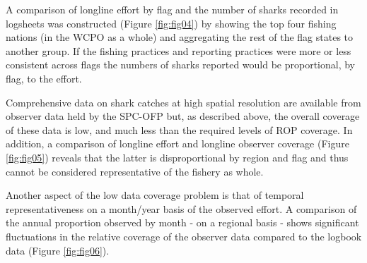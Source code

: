 \documentclass[12pt]{SCreport}
\begin{document}
A comparison of longline effort by flag and the number of sharks recorded in logsheets was constructed (Figure \ref{fig:fig04}) by showing the top four fishing nations (in the WCPO as a whole) and aggregating the rest of the flag states to another group. If the fishing practices and reporting practices were more or less consistent across flags the numbers of sharks reported would be proportional, by flag, to the effort.

Comprehensive data on shark catches at high spatial resolution are available from observer data held by the SPC-OFP but, as described above, the overall coverage of these data is low, and much less than the required levels of ROP coverage. In addition, a comparison of longline effort and longline observer coverage (Figure \ref{fig:fig05}) reveals that the latter is disproportional by region and flag and thus cannot be considered representative of the fishery as whole.

Another aspect of the low data coverage problem is that of temporal representativeness on a month/year basis of the observed effort. A comparison of the annual proportion observed by month - on a regional basis - shows significant fluctuations in the relative coverage of the observer data compared to the logbook data (Figure \ref{fig:fig06}).
\end{document}
